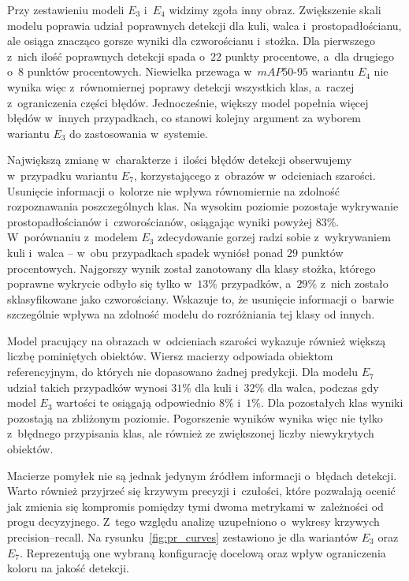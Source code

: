 Przy zestawieniu modeli $E_3$ i~$E_4$ widzimy zgoła inny obraz. Zwiększenie skali modelu poprawia udział poprawnych detekcji dla kuli, walca i~prostopadłościanu, ale osiąga znacząco gorsze wyniki dla czworościanu i~stożka. Dla pierwszego z~nich ilość poprawnych detekcji spada o~$22$ punkty procentowe, a~dla drugiego o~$8$ punktów procentowych. Niewielka przewaga w~$mAP50\text{-}95$ wariantu $E_4$ nie wynika więc z~równomiernej poprawy detekcji wszystkich klas, a~raczej z~ograniczenia części błędów. Jednocześnie, większy model popełnia więcej błędów w~innych przypadkach, co stanowi kolejny argument za wyborem wariantu $E_3$ do zastosowania w~systemie.

Największą zmianę w~charakterze i~ilości błędów detekcji obserwujemy w~przypadku wariantu $E_7$, korzystającego z~obrazów w~odcieniach szarości. Usunięcie informacji o~kolorze nie wpływa równomiernie na zdolność rozpoznawania poszczególnych klas. Na wysokim poziomie pozostaje wykrywanie prostopadłościanów i~czworościanów, osiągając wyniki powyżej $83\%$. W~porównaniu z~modelem $E_3$ zdecydowanie gorzej radzi sobie z~wykrywaniem kuli i~walca -- w~obu przypadkach spadek wyniósł ponad $29$ punktów procentowych. Najgorszy wynik został zanotowany dla klasy stożka, którego poprawne wykrycie odbyło się tylko w~$13\%$ przypadków, a~$29\%$ z~nich zostało sklasyfikowane jako czworościany. Wskazuje to, że usunięcie informacji o~barwie szczególnie wpływa na zdolność modelu do rozróżniania tej klasy od innych.

Model pracujący na obrazach w~odcieniach szarości wykazuje również większą liczbę pominiętych obiektów. Wiersz  macierzy odpowiada obiektom referencyjnym, do których nie dopasowano żadnej predykcji. Dla modelu $E_7$ udział takich przypadków wynosi $31\%$ dla kuli i~$32\%$ dla walca, podczas gdy model $E_3$ wartości te osiągają odpowiednio $8\%$ i~$1\%$. Dla pozostałych klas wyniki pozostają na zbliżonym poziomie. Pogorszenie wyników wynika więc nie tylko z~błędnego przypisania klas, ale również ze zwiększonej liczby niewykrytych obiektów.

Macierze pomyłek nie są jednak jedynym źródłem informacji o~błędach detekcji. Warto również przyjrzeć się krzywym precyzji i~czułości, które pozwalają ocenić jak zmienia się kompromis pomiędzy tymi dwoma metrykami w~zależności od progu decyzyjnego. Z~tego względu analizę uzupełniono o~wykresy krzywych precision--recall. Na rysunku~\ref{fig:pr_curves} zestawiono je dla wariantów $E_3$ oraz $E_7$. Reprezentują one wybraną konfigurację docelową oraz wpływ ograniczenia koloru na jakość detekcji.

